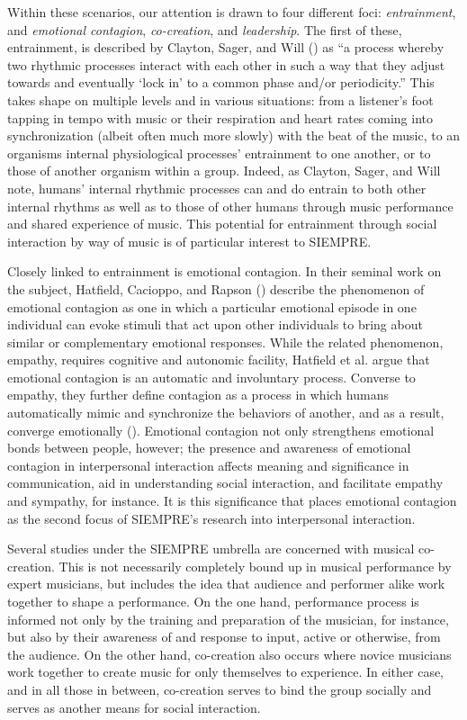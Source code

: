 \documentclass{sig-alternate}
\begin{document}
Within these scenarios, our attention is drawn to four different foci: \textit{entrainment}, and \textit{emotional contagion}, \textit{co-creation}, and \textit{leadership}.  The first of these, entrainment, is described by Clayton, Sager, and Will (\cite{Clayton:2005wc}) as ``a process whereby two rhythmic processes interact with each other in such a way that they adjust towards and eventually `lock in' to a common phase and/or periodicity.''  This takes shape on multiple levels and in various situations: from a listener's foot tapping in tempo with music or their respiration and heart rates coming into synchronization (albeit often much more slowly) with the beat of the music, to an organisms internal physiological processes' entrainment to one another, or to those of another organism within a group.  Indeed, as Clayton, Sager, and Will note, humans' internal rhythmic processes can and do entrain to both other internal rhythms as well as to those of other humans through music performance and shared experience of music.  This potential for entrainment through social interaction by way of music is of particular interest to SIEMPRE.

Closely linked to entrainment is emotional contagion.  In their seminal work on the subject, Hatfield, Cacioppo, and Rapson (\cite{Hatfield:1994us}) describe the phenomenon of emotional contagion as one in which a particular emotional episode in one individual can evoke stimuli that act upon other individuals to bring about similar or complementary emotional responses.  While the related phenomenon, empathy, requires cognitive and autonomic facility, Hatfield et al. argue that emotional contagion is an automatic and involuntary process.  Converse to empathy, they further define contagion as a process in which humans automatically mimic and synchronize the behaviors of another, and as a result, converge emotionally (\cite{Hatfield:1992us}).  Emotional contagion not only strengthens emotional bonds between people, however; the presence and awareness of emotional contagion in interpersonal interaction affects meaning and significance in communication, aid in understanding social interaction, and facilitate empathy and sympathy, for instance.  It is this significance that places emotional contagion as the second focus of SIEMPRE's research into interpersonal interaction.

Several studies under the SIEMPRE umbrella are concerned with musical co-creation.  This is not necessarily completely bound up in musical performance by expert musicians, but includes the idea that audience and performer alike work together to shape a performance.  On the one hand, performance process is informed not only by the training and preparation of the musician, for instance, but also by their awareness of and response to input, active or otherwise, from the audience.  On the other hand, co-creation also occurs where novice musicians work together to create music for only themselves to experience.  In either case, and in all those in between, co-creation serves to bind the group socially and serves as another means for social interaction.
\end{document}
